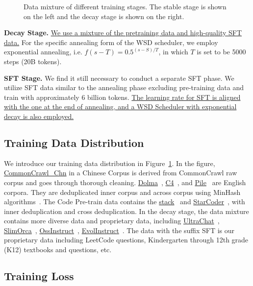 \begin{figure}[htbp]
\begin{minipage}{0.48\linewidth}
    \end{minipage}
    \caption{Data mixture of different training stages. The stable stage is shown on the left and the decay stage is shown on the right.}
    \label{fig:appdatamixture}
\end{figure}

\textbf{Decay Stage.}
\uline{We use a mixture of the pretraining data and high-quality SFT data.} For the specific annealing form of the WSD scheduler, we employ exponential annealing, i.e. $f(s-T)=  0.5^{(s-S)/T}$, in which $T$ is set to be 5000 steps (20B tokens).

\textbf{SFT Stage.} We find it still necessary to conduct a separate SFT phase. We utilize SFT data similar to the annealing phase excluding pre-training data and train with approximately 6 billion tokens. \uline{The learning rate for SFT is aligned with the one at the end of annealing, and a WSD Scheduler with exponential decay is also employed.}

\subsection{Training Data Distribution}
\label{sec:appdatadistrbution}

We introduce our training data distribution in Figure~\ref{fig:appdatamixture}. In the figure, \uline{CommonCrawl\_Chn} in a Chinese Corpus is derived from CommonCrawl raw corpus and goes through thorough cleaning. \uline{Dolma}~\citep{dolma}, \uline{C4}~\citep{2019t5}, and \uline{Pile}~\citep{gao2020pile, biderman2022datasheet} are English corpora. They are deduplicated inner corpus and across corpus using MinHash algorithms~\citep{broder1997resemblance}. The Code Pre-train data contains the \uline{stack}~\citep{Kocetkov2022TheStack} and \uline{StarCoder}~\cite{li2023starcoder}, with inner deduplication and cross deduplication. In the decay stage, the data mixture contains more diverse data and proprietary data, including \uline{UltraChat}~\citep{ding2023enhancing}, \uline{SlimOrca}~\citep{SlimOrca, SlimOrcaDedup}, \uline{OssInstruct}~\citep{wei2023magicoder}, \uline{EvolInstruct}~\citep{xu2023wizardlm}. The data with the suffix SFT is our proprietary data including LeetCode questions, Kindergarten through 12th grade (K12) textbooks and questions, etc. 

\subsection{Training Loss}

